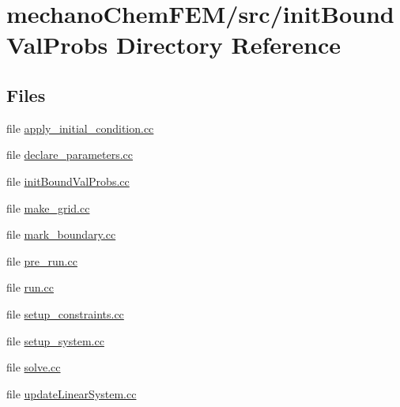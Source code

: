 \section{mechano\+Chem\+F\+E\+M/src/init\+Bound\+Val\+Probs Directory Reference}
\label{dir_4f4f39f3c8a43cd00cf68b431ac1095b}
\subsection*{Files}
\begin{DoxyCompactItemize}
\item 
file \mbox{\hyperlink{apply__initial__condition_8cc}{apply\+\_\+initial\+\_\+condition.\+cc}}
\item 
file \mbox{\hyperlink{init_bound_val_probs_2declare__parameters_8cc}{declare\+\_\+parameters.\+cc}}
\item 
file \mbox{\hyperlink{init_bound_val_probs_8cc}{init\+Bound\+Val\+Probs.\+cc}}
\item 
file \mbox{\hyperlink{make__grid_8cc}{make\+\_\+grid.\+cc}}
\item 
file \mbox{\hyperlink{mark__boundary_8cc}{mark\+\_\+boundary.\+cc}}
\item 
file \mbox{\hyperlink{pre__run_8cc}{pre\+\_\+run.\+cc}}
\item 
file \mbox{\hyperlink{run_8cc}{run.\+cc}}
\item 
file \mbox{\hyperlink{setup__constraints_8cc}{setup\+\_\+constraints.\+cc}}
\item 
file \mbox{\hyperlink{setup__system_8cc}{setup\+\_\+system.\+cc}}
\item 
file \mbox{\hyperlink{solve_8cc}{solve.\+cc}}
\item 
file \mbox{\hyperlink{update_linear_system_8cc}{update\+Linear\+System.\+cc}}
\end{DoxyCompactItemize}

